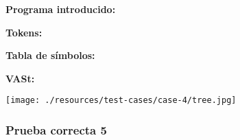 \documentclass[11pt, , a4paper, titlepage]{article}
\newenvironment{changemargin}[2]{%
\begin{list}{}{%
\setlength{\topsep}{0pt}%
\setlength{\leftmargin}{#1}%
\setlength{\rightmargin}{#2}%
\setlength{\listparindent}{\parindent}%
\setlength{\itemindent}{\parindent}%
\setlength{\parsep}{\parskip}%
}%
\item[]}{\end{list}}
\begin{document}
\begin{changemargin}{+0.5cm}{+0cm}
    \vspace{1mm}

    \textbf{Programa introducido:}
    \begin{changemargin}{+0.5cm}{+0cm}
        
    \end{changemargin}

    \vspace{2mm}

    \textbf{Tokens:}
    \vspace{1mm}
    \begin{changemargin}{+0.5cm}{+0cm}
    \end{changemargin}

    \vspace{2mm}

    \textbf{Tabla de símbolos:}
    \vspace{1mm}
    \begin{changemargin}{+0.5cm}{+0cm}
    \end{changemargin}

    \clearpage

    \textbf{VASt:}
    \vspace{1mm}
    \begin{center}
        \texttt{[image: ./resources/test-cases/case-4/tree.jpg]}
    \end{center}

\end{changemargin}
\clearpage

\subsubsection{Prueba correcta 5}
\end{document}
